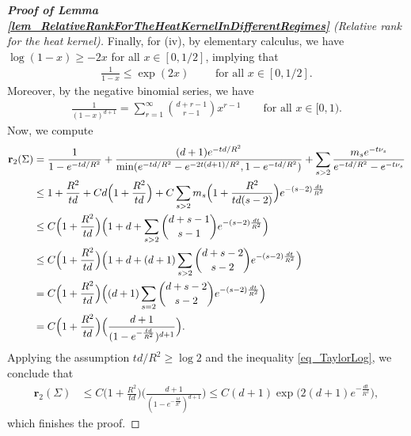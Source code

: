 \documentclass[a4paper,11pt]{article} %
\numberwithin{equation}{section}
\theoremstyle{definition}
\theoremstyle{remark}
\theoremstyle{plain}
\begin{document}
\begin{proof}[\normalfont \textbf{Proof of Lemma \ref{lem_RelativeRankForTheHeatKernelInDifferentRegimes}} (Relative rank for the heat kernel)]
  Finally, for (iv), by elementary calculus, we have $\log(1 - x) \ge -2 x$ for all $x \in [0, 1/2]$, implying that 
  \begin{align}
    \label{eq_TaylorLog}
    \frac{1}{1 - x} \le \exp(2 x) \qquad \text{ for all } x \in [0, 1/2].
  \end{align}
  Moreover, by the negative binomial series, we have 
  \begin{align}
    \frac{1}{(1 - x)^{d + 1}} = \sum_{r = 1}^\infty \binom{d + r - 1}{r - 1} x^{r - 1}
    \qquad \text{for all } x \in [0, 1).
  \end{align}
  Now, we compute
  \begin{align}
        \mathbf{r}_2(\Sigma) 
    & = \frac{1}{1 - e^{-t d / R^2}} 
      + \frac{(d + 1) e^{-t d / R^2}}
             {\min(e^{-t d / R^2} - e^{-2 t (d + 1) / R^2}, 1 - e^{-t d / R^2})}
      + \sum_{s > 2} \frac{m_s e^{-t \nu_s}}{e^{-t d / R^2} - e^{-t \nu_s}} 
    \notag 
    \\
    & \le     1 + \frac{R^2}{t d} 
        + C d \Big( 1 + \frac{R^2}{t d} \Big)
        + C \sum_{s > 2} m_s \Big( 1 + \frac{R^2}{t d (s - 2)} \Big) e^{-(s - 2) \frac{d t}{R^2}} 
    \\
    & \le C \Big( 1 + \frac{R^2}{t d} \Big) 
            \Big( 1 + d + \sum_{s > 2} \binom{d + s - 1}{s - 1} e^{-(s - 2) \frac{d t}{R^2}} \Big)
    \notag 
    \\
    & \le C \Big( 1 + \frac{R^2}{t d} \Big)
            \Big(1 + d + (d + 1) \sum_{s > 2} 
                                 \binom{d + s - 2}{s - 2} e^{-(s - 2) \frac{d t}{R^2}} 
            \Big)
    \notag 
    \\
    & = C \Big( 1 + \frac{R^2}{t d} \Big) 
          \Big( (d + 1) \sum_{s = 2} \binom{d + s - 2}{s - 2} e^{-(s - 2) \frac{d t}{R^2}} \Big)
    \notag 
    \\
    & = C \Big( 1 + \frac{R^2}{t d} \Big)
          \Big( \frac{d + 1}{(1 - e^{-\frac{t d}{R^2}})^{d + 1}} \Big).
    \notag 
  \end{align}
  Applying the assumption $t d / R^2 \ge \log 2$ and the inequality \eqref{eq_TaylorLog}, we conclude that
  \begin{align}
    \mathbf{r}_2(\Sigma) & \le C \Big( 1 + \frac{R^2}{t d} \Big) 
    \Big(\frac{d+1}{(1-e^{-\frac{td}{R^2}})^{d+1}}\Big)
    \leq
    C (d + 1) \exp\Big( 2 (d + 1) e^{-\frac{d t}{R^2}} \Big),
  \end{align}
  which finishes the proof.
\end{proof}%
\end{document}
